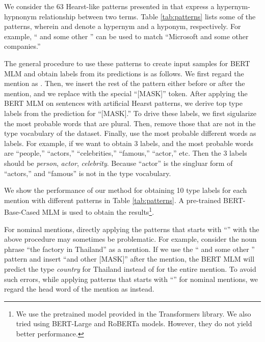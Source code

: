 \documentclass[11pt,a4paper]{article}
\begin{document}
We consider the 63 Hearst-like patterns \cite{hearst1992automatic} presented in \cite{seitner2016large} that express a hypernym-hypnonym relationship between two terms. Table \ref{tab:patterns} lists some of the patterns, wherein  and  denote a hypernym and a hyponym, respectively. For example, `` and some other '' can be used to match ``Microsoft and some other companies.''


The general procedure to use these patterns to create input samples for BERT MLM and obtain labels from its predictions is as follows. We first regard the mention as . Then, we insert the rest of the pattern either before or after the mention, and  we replace  with the special ``[MASK]'' token. After applying the BERT MLM on sentences with artificial Hearst patterns, we derive top  type labels from the prediction for ``[MASK].''
To drive these  labels, we first sigularize the most probable words that are plural. Then, remove those that are not in the type vocabulary of the dataset. Finally, use the most probable  different words as  labels. For example, if we want to obtain 3 labels, and the most probable words are ``people,'' ``actors,'' ``celebrities,'' ``famous,'' ``actor,'' etc. Then the 3 labels should be \textit{person}, \textit{actor}, \textit{celebrity}. Because ``actor'' is the singluar form of ``actors,'' and ``famous'' is not in the type vocabulary.

We show the performance of our method for obtaining 10 type labels for each mention with different patterns in Table \ref{tab:patterns}. A pre-trained BERT-Base-Cased MLM is used to obtain the results\footnote{We use the pretrained model provided in the Transformers library. We also tried using BERT-Large and RoBERTa models. However, they do not yield better performance.}.



For nominal mentions, directly applying the patterns that starts with ``'' with the above procedure may sometimes be problematic. For example, consider the noun phrase ``the factory in Thailand'' as a mention. If we use the `` and some other '' pattern and insert ``and other [MASK]'' after the mention, the BERT MLM will predict the type \textit{country} for Thailand instead of for the entire mention. To avoid such errors, while applying patterns that starts with ``'' for nominal mentions, we regard the head word of the mention as  instead.
\end{document}

